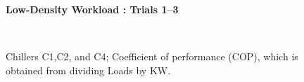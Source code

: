 \documentclass{report}
\begin{document}
\begin{figure}[!h]
\centerline{\bfseries\large Low-Density Workload : Trials 1--3}\\
\caption{Chillers C1,C2, and C4; Coefficient of performance (COP), which is obtained from dividing Loads by KW.}
\end{figure}
\end{document}
